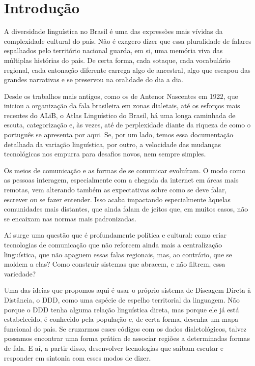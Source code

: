  \chapter{Introdução} %

\begin{flushleft}
A diversidade linguística no Brasil é uma das expressões mais vívidas da complexidade cultural do país. Não é exagero dizer que essa pluralidade de falares espalhados pelo território nacional guarda, em si, uma memória viva das múltiplas histórias do país. De certa forma, cada sotaque, cada vocabulário regional, cada entonação diferente carrega algo de ancestral, algo que escapou das grandes narrativas e se preservou na oralidade do dia a dia.

Desde os trabalhos mais antigos, como os de Antenor Nascentes em 1922, que iniciou a organização da fala brasileira em zonas dialetais, até os esforços mais recentes do ALiB, o Atlas Linguístico do Brasil, há uma longa caminhada de escuta, categorização e, às vezes, até de perplexidade diante da riqueza de como o português se apresenta por aqui. Se, por um lado, temos essa documentação detalhada da variação linguística, por outro, a velocidade das mudanças tecnológicas nos empurra para desafios novos, nem sempre simples.

Os meios de comunicação e as formas de se comunicar evoluíram. O modo como as pessoas interagem, especialmente com a chegada da internet em áreas mais remotas, vem alterando também as expectativas sobre como se deve falar, escrever ou se fazer entender. Isso acaba impactando especialmente àquelas comunidades mais distantes, que ainda falam de jeitos que, em muitos casos, não se encaixam nas normas mais padronizadas.

Aí surge uma questão que é profundamente política e cultural: como criar tecnologias de comunicação que não reforcem ainda mais a centralização linguística, que não apaguem essas falas regionais, mas, ao contrário, que se moldem a elas? Como construir sistemas que abracem, e não filtrem, essa variedade?

Uma das ideias que propomos aqui é usar o próprio sistema de Discagem Direta à Distância, o DDD, como uma espécie de espelho territorial da linguagem. Não porque o DDD tenha alguma relação linguística direta, mas porque ele já está estabelecido, é conhecido pela população e, de certa forma, desenha um mapa funcional do país. Se cruzarmos esses códigos com os dados dialetológicos, talvez possamos encontrar uma forma prática de associar regiões a determinadas formas de fala. E aí, a partir disso, desenvolver tecnologias que saibam escutar e responder em sintonia com esses modos de dizer.


\end{flushleft}
